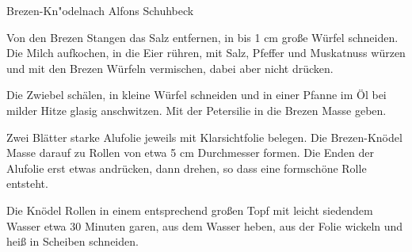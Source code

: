 \begin{recipe}{Brezen-Kn"odel}{nach Alfons Schuhbeck}
  \inglist

  \steps
  Von den Brezen Stangen das Salz entfernen, in \halb bis 1 cm große Würfel schneiden. Die
  Milch aufkochen, in die Eier rühren, mit Salz, Pfeffer und Muskatnuss würzen und mit den
  Brezen Würfeln vermischen, dabei aber nicht drücken.

  Die Zwiebel schälen, in kleine Würfel schneiden und in einer Pfanne im Öl bei milder Hitze
  glasig anschwitzen.  Mit der Petersilie in die Brezen Masse geben.

  Zwei Blätter starke Alufolie jeweils mit Klarsichtfolie belegen. Die Brezen-Knödel Masse
  darauf zu Rollen von etwa 5 cm Durchmesser formen. Die Enden der Alufolie erst etwas
  andrücken, dann drehen, so dass eine formschöne Rolle entsteht.

  Die Knödel Rollen in einem entsprechend großen Topf mit leicht siedendem Wasser etwa 30
  Minuten garen, aus dem Wasser heben, aus der Folie wickeln und heiß in Scheiben schneiden.
\end{recipe}
